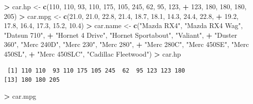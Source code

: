 \documentclass[]{krantz}
\makeatletter
\newenvironment{Shaded}{\begin{snugshade}}{\end{snugshade}}
\newcommand{\KeywordTok}[1]{\textcolor[rgb]{0.27,0.27,0.27}{\textbf{#1}}}
\newcommand{\DecValTok}[1]{\textcolor[rgb]{0.06,0.06,0.06}{#1}}
\newcommand{\FloatTok}[1]{\textcolor[rgb]{0.06,0.06,0.06}{#1}}
\newcommand{\StringTok}[1]{\textcolor[rgb]{0.5,0.5,0.5}{#1}}
\newcommand{\OperatorTok}[1]{\textcolor[rgb]{0.43,0.43,0.43}{\textbf{#1}}}
\newcommand{\NormalTok}[1]{#1}
\newenvironment{kframe}{%
\medskip{}
\setlength{\fboxsep}{.8em}
 \def\at@end@of@kframe{}%
 \ifinner\ifhmode%
  \def\at@end@of@kframe{\end{minipage}}%
  \begin{minipage}{\columnwidth}%
 \fi\fi%
 \def\FrameCommand##1{\hskip\@totalleftmargin \hskip-\fboxsep
 \colorbox{shadecolor}{##1}\hskip-\fboxsep
     \hskip-\linewidth \hskip-\@totalleftmargin \hskip\columnwidth}%
 \MakeFramed {\advance\hsize-\width
   \@totalleftmargin\z@ \linewidth\hsize
   \@setminipage}}%
 {\par\unskip\endMakeFramed%
 \at@end@of@kframe}
\renewenvironment{Shaded}{\begin{kframe}}{\end{kframe}}
\makeatother
\begin{document}
\begin{Shaded}
\begin{Highlighting}[]
\OperatorTok{>}\StringTok{ }\NormalTok{car.hp <-}\StringTok{ }\KeywordTok{c}\NormalTok{(}\DecValTok{110}\NormalTok{, }\DecValTok{110}\NormalTok{, }\DecValTok{93}\NormalTok{, }\DecValTok{110}\NormalTok{, }\DecValTok{175}\NormalTok{, }\DecValTok{105}\NormalTok{, }\DecValTok{245}\NormalTok{, }\DecValTok{62}\NormalTok{, }\DecValTok{95}\NormalTok{, }\DecValTok{123}\NormalTok{, }
\OperatorTok{+}\StringTok{ }\DecValTok{123}\NormalTok{, }\DecValTok{180}\NormalTok{, }\DecValTok{180}\NormalTok{, }\DecValTok{180}\NormalTok{, }\DecValTok{205}\NormalTok{)}
\OperatorTok{>}\StringTok{ }\NormalTok{car.mpg <-}\StringTok{ }\KeywordTok{c}\NormalTok{(}\FloatTok{21.0}\NormalTok{, }\FloatTok{21.0}\NormalTok{, }\FloatTok{22.8}\NormalTok{, }\FloatTok{21.4}\NormalTok{, }\FloatTok{18.7}\NormalTok{, }\FloatTok{18.1}\NormalTok{, }\FloatTok{14.3}\NormalTok{, }\FloatTok{24.4}\NormalTok{, }\FloatTok{22.8}\NormalTok{, }
\OperatorTok{+}\StringTok{              }\FloatTok{19.2}\NormalTok{, }\FloatTok{17.8}\NormalTok{, }\FloatTok{16.4}\NormalTok{, }\FloatTok{17.3}\NormalTok{, }\FloatTok{15.2}\NormalTok{, }\FloatTok{10.4}\NormalTok{)}
\OperatorTok{>}\StringTok{ }\NormalTok{car.name <-}\StringTok{ }\KeywordTok{c}\NormalTok{(}\StringTok{"Mazda RX4"}\NormalTok{, }\StringTok{"Mazda RX4 Wag"}\NormalTok{, }\StringTok{"Datsun 710"}\NormalTok{, }
\OperatorTok{+}\StringTok{               "Hornet 4 Drive"}\NormalTok{, }\StringTok{"Hornet Sportabout"}\NormalTok{, }\StringTok{"Valiant"}\NormalTok{, }
\OperatorTok{+}\StringTok{               "Duster 360"}\NormalTok{, }\StringTok{"Merc 240D"}\NormalTok{, }\StringTok{"Merc 230"}\NormalTok{, }\StringTok{"Merc 280"}\NormalTok{, }
\OperatorTok{+}\StringTok{               "Merc 280C"}\NormalTok{, }\StringTok{"Merc 450SE"}\NormalTok{, }\StringTok{"Merc 450SL"}\NormalTok{, }
\OperatorTok{+}\StringTok{               "Merc 450SLC"}\NormalTok{, }\StringTok{"Cadillac Fleetwood"}\NormalTok{)}
\OperatorTok{>}\StringTok{ }\NormalTok{car.hp}
\end{Highlighting}
\end{Shaded}

\begin{verbatim}
 [1] 110 110  93 110 175 105 245  62  95 123 123 180
[13] 180 180 205
\end{verbatim}

\begin{Shaded}
\begin{Highlighting}[]
\OperatorTok{>}\StringTok{ }\NormalTok{car.mpg}
\end{Highlighting}
\end{Shaded}
\end{document}
